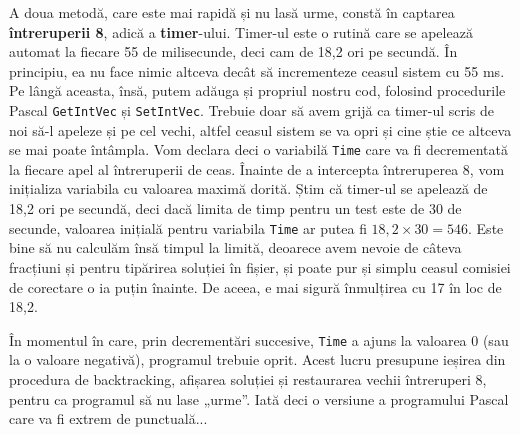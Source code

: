 A doua metodă, care este mai rapidă și nu lasă urme, constă în captarea {\bf
  întreruperii 8}, adică a {\bf timer}-ului. Timer-ul este o rutină care se
apelează automat la fiecare 55 de milisecunde, deci cam de 18,2 ori pe
secundă. În principiu, ea nu face nimic altceva decât să incrementeze ceasul
sistem cu 55 ms. Pe lângă aceasta, însă, putem adăuga și propriul nostru cod,
folosind procedurile Pascal {\tt GetIntVec} și {\tt SetIntVec}. Trebuie doar
să avem grijă ca timer-ul scris de noi să-l apeleze și pe cel vechi, altfel
ceasul sistem se va opri și cine știe ce altceva se mai poate întâmpla. Vom
declara deci o variabilă {\tt Time} care va fi decrementată la fiecare apel al
întreruperii de ceas. Înainte de a intercepta întreruperea 8, vom inițializa
variabila cu valoarea maximă dorită. Știm că timer-ul se apelează de 18,2 ori
pe secundă, deci dacă limita de timp pentru un test este de 30 de secunde,
valoarea inițială pentru variabila {\tt Time} ar putea fi $18,2 \times 30 =
546$. Este bine să nu calculăm însă timpul la limită, deoarece avem nevoie de
câteva fracțiuni și pentru tipărirea soluției în fișier, și poate pur și
simplu ceasul comisiei de corectare o ia puțin înainte. De aceea, e mai sigură
înmulțirea cu 17 în loc de 18,2.

În momentul în care, prin decrementări succesive, {\tt Time} a ajuns la
valoarea 0 (sau la o valoare negativă), programul trebuie oprit. Acest lucru
presupune ieșirea din procedura de backtracking, afișarea soluției și
restaurarea vechii întreruperi 8, pentru ca programul să nu lase „urme”. Iată
deci o versiune a programului Pascal care va fi extrem de punctuală...

\inputminted{pascal}{src/chapter5-2.pas}

